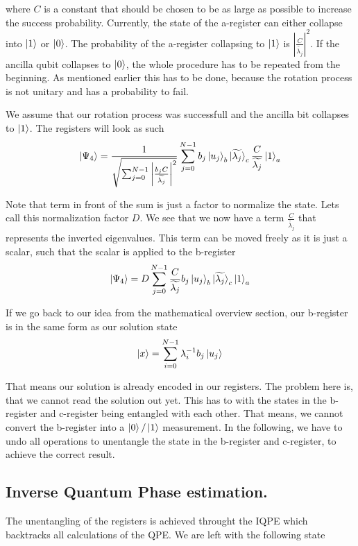 where $C$ is a constant that should be chosen to be as large as possible to increase the success probability.
Currently, the state of the a-register can either collapse into $\ket 1$ or $\ket 0$. 
The probability of the a-register collapsing to $\ket 1$ is $\left|\frac C {\widetilde{\lambda_j}}\right|^2$.
If the ancilla qubit collapses to $\ket 0$, the whole procedure has to be repeated from the beginning. 
As mentioned earlier this has to be done, because the rotation process is not unitary and has a probability to fail.

We assume that our rotation process was successfull and the ancilla bit collapses to $\ket 1$. 
The registers will look as such
\begin{equation}
\ket{\Psi_4}= \frac {1} {\sqrt{\sum_{j=0}^{N-1}   \left|  \frac{b_jC} {\widetilde{\lambda_j}}\right|^2   }} 
\sum_{j=0}^{N-1} b_j \ket{u_j}_b \ket{\widetilde{\lambda_j}}_c \frac{C}{\widetilde{\lambda_j}} \ket1_a
\end{equation}

Note that term in front of the sum is just a factor to normalize the state. 
Lets call this normalization factor $D$.
We see that we now have a term $\frac{C}{\widetilde{\lambda_j}}$ that represents the inverted eigenvalues. 
This term can be moved freely as it is just a scalar,  such that the scalar is applied to the b-register
\begin{equation}
\ket{\Psi_4}= D
\sum_{j=0}^{N-1} \frac{C}{\widetilde{\lambda_j}} b_j \ket{u_j}_b \ket{\widetilde{\lambda_j}}_c \ket1_a
\end{equation}

If we go back to our idea from the mathematical overview section, our b-register is in the same form as our solution state
\begin{equation}
\ket{x} = \sum_{i=0}^{N-1} \lambda_i^{-1} b_j\ket{u_j}\\
\end{equation}

That means our solution is already encoded in our registers. 
The problem here is, that we cannot read the solution out yet.
This has to with the states in the b-register and c-register being entangled with each other. 
That means, we cannot convert the b-register into a $\ket0 / \ket 1$ measurement.
In the following, we have to undo all operations to unentangle the state in the b-register and c-register, to achieve the correct result.

\subsection{Inverse Quantum Phase estimation.}
The unentangling of the registers is achieved throught the IQPE which backtracks all calculations of the QPE.
We are left with the following state

